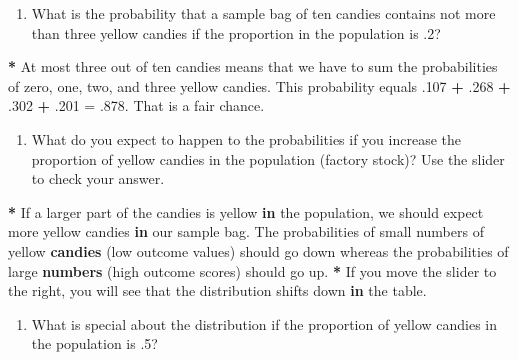 \documentclass[a4paper]{book}
\newenvironment{Shaded}{\begin{snugshade}}{\end{snugshade}}
\newcommand{\KeywordTok}[1]{\textcolor[rgb]{0,0,0}{\textbf{#1}}}
\newcommand{\DecValTok}[1]{\textcolor[rgb]{0.00,0.00,0.00}{#1}}
\newcommand{\StringTok}[1]{\textcolor[rgb]{0.00,0.00,0.00}{#1}}
\newcommand{\ControlFlowTok}[1]{\textcolor[rgb]{0.00,0.00,0.00}{\textbf{#1}}}
\newcommand{\OperatorTok}[1]{\textcolor[rgb]{0.00,0.00,0.00}{\textbf{#1}}}
\newcommand{\NormalTok}[1]{#1}
\providecommand{\tightlist}{%
  \setlength{\itemsep}{0pt}\setlength{\parskip}{0pt}}
\theoremstyle{definition}
\theoremstyle{definition}
\theoremstyle{definition}
\theoremstyle{remark}
\begin{document}
\begin{enumerate}
\def\labelenumi{\arabic{enumi}.}
\setcounter{enumi}{2}
\tightlist
\item
  What is the probability that a sample bag of ten candies contains not
  more than three yellow candies if the proportion in the population is
  .2?
\end{enumerate}

\begin{Shaded}
\begin{Highlighting}[]
\OperatorTok{*}\StringTok{ }\NormalTok{At most three out of ten candies means that we have to sum the probabilities}
\NormalTok{of zero, one, two, and three yellow candies. This probability equals .}\DecValTok{107} \OperatorTok{+}
\NormalTok{.}\DecValTok{268} \OperatorTok{+}\StringTok{ }\NormalTok{.}\DecValTok{302} \OperatorTok{+}\StringTok{ }\NormalTok{.}\DecValTok{201}\NormalTok{ =}\StringTok{ }\NormalTok{.}\DecValTok{878}\NormalTok{. That is a fair chance.}
\end{Highlighting}
\end{Shaded}

\begin{enumerate}
\def\labelenumi{\arabic{enumi}.}
\setcounter{enumi}{3}
\tightlist
\item
  What do you expect to happen to the probabilities if you increase the
  proportion of yellow candies in the population (factory stock)? Use
  the slider to check your answer.
\end{enumerate}

\begin{Shaded}
\begin{Highlighting}[]
\OperatorTok{*}\StringTok{ }\NormalTok{If a larger part of the candies is yellow }\ControlFlowTok{in}\NormalTok{ the population, we should}
\NormalTok{expect more yellow candies }\ControlFlowTok{in}\NormalTok{ our sample bag. The probabilities of small}
\NormalTok{numbers of yellow }\KeywordTok{candies}\NormalTok{ (low outcome values) should go down whereas the}
\NormalTok{probabilities of large }\KeywordTok{numbers}\NormalTok{ (high outcome scores) should go up.}
\OperatorTok{*}\StringTok{ }\NormalTok{If you move the slider to the right, you will see that the distribution}
\NormalTok{shifts down }\ControlFlowTok{in}\NormalTok{ the table.}
\end{Highlighting}
\end{Shaded}

\begin{enumerate}
\def\labelenumi{\arabic{enumi}.}
\setcounter{enumi}{4}
\tightlist
\item
  What is special about the distribution if the proportion of yellow
  candies in the population is .5?
\end{enumerate}
\end{document}
